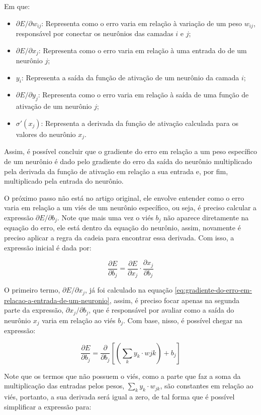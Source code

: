 Em que: 

\begin{itemize}
    \item $\partial E / \partial w_{ij}$: Representa como o erro varia em relação à variação de um peso $w_{ij}$, responsável por conectar os neurônios das camadas $i$ e $j$;
    \item $\partial E / \partial x_j$: Representa como o erro varia em relação à uma entrada do de um neurônio $j$;
    \item $y_i$: Representa a saída da função de ativação de um neurônio da camada $i$;
    \item $\partial E / \partial y_j$: Representa como o erro varia em relação à saída de uma função de ativação de um neurônio $j$;
    \item $\sigma'(x_j)$: Representa a derivada da função de ativação calculada para os valores do neurônio $x_j$.
\end{itemize}

Assim, é possível concluir que o gradiente do erro em relação a um peso específico de um neurônio é dado pelo gradiente do erro da saída do neurônio multiplicado pela derivada da função de ativação em relação a sua entrada e, por fim, multiplicado pela entrada do neurônio.

O próximo passo não está no artigo original, ele envolve entender como o erro varia em relação a um viés de um neurônio específico, ou seja, é preciso calcular a expressão $\partial E / \partial b_j$. Note que mais uma vez o viés $b_j$ não aparece diretamente na equação do erro, ele está dentro da equação do neurônio, assim, novamente é preciso aplicar a regra da cadeia para encontrar essa derivada. Com isso, a expressão inicial é dada por:

\[
    \frac{\partial E}{\partial b_j} = \frac{\partial E}{\partial x_j} \cdot \frac{\partial x_j}{\partial b_j}
\]

O primeiro termo, $\partial E / \partial x_j$, já foi calculado na equação \ref{eq:gradiente-do-erro-em-relacao-a-entrada-de-um-neuronio}, assim, é preciso focar apenas na segunda parte da expressão, $\partial x_j / \partial b_j$, que é responsável por avaliar como a saída do neurônio $x_j$ varia em relação ao viés $b_j$. Com base, nisso, é possível chegar na expressão:

\[
    \frac{\partial E}{\partial b_j} = \frac{\partial}{\partial b_j} \left[ \left( \sum_k y_k \cdot w{jk} \right) + b_j \right]
\]

Note que os termos que não possuem o viés, como a parte que faz a soma da multiplicação das entradas pelos pesos, $\sum_k y_k \cdot w_{jk}$, são constantes em relação ao viés, portanto, a sua derivada será igual a zero, de tal forma que é possível simplificar a expressão para:

